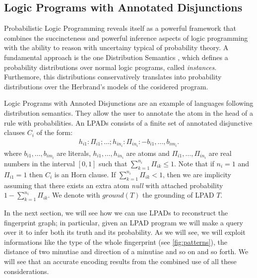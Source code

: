 \documentclass[8pt]{article}
\begin{document}
\subsection{Logic Programs with Annotated Disjunctions}
\label{sub:lpads}
Probabilistic Logic Programming reveals itself as a powerful framework that
combines the succincteness and powerful inference aspects of logic programming
with the ability to reason with uncertainy typical of probability theory.
A fundamental approach is the one Distribution Semantics
\cite{sato1995statistical}, which defines a probability distributions over
normal logic programs, called \emph{instances}. Furthemore, this distributions
conservatively translates into probability distributions over the Herbrand's
models of the cosidered program.

Logic Programs with Annoted Disjunctions \cite{vennekens2004logic} are an
example of languages following distribution semantics. They allow the user to
annotate the atom in the head of a rule with probabilities. An LPADs consists
of a finite set of annotated disjunctive clauses $C_i$ of the form:
  \begin{align*}
    h_{i1}:\Pi_{i1}; \dots ; h_{in_i}:\Pi_{in_i} \colon- b_{i1},\dots,b_{im_i}.
  \end{align*}
where $b_{i1},\dots,b_{im_i}$ are literals, $h_{i1},\dots,h_{in_i}$ are atoms
and $\Pi_{i1},\dots,\Pi_{in_i}$ are real numbers in the interval $[0,1]$ such
that $\sum_{k=1}^{n_i} \Pi_{ik} \le 1$. Note that if $n_i=1$ and $\Pi_{i1}=1$
then $C_i$ is an Horn clause.
If $\sum_{k=1}^{n_i} \Pi_{ik} < 1$, then we are implicity assuming that there
exists an extra atom \emph{null} with attached probability $1-\sum_{k=1}^{n_i}
\Pi_{ik}$. We denote with $ground(T)$ the grounding of LPAD $T$.

In the next section, we will see how we can use LPADs to reconstruct the
fingerprint graph; in particular, given an LPAD program we will make a query
over it to infer both its truth and its probability.  As we will see, we will
exploit informations like the type of the whole fingerprint (see
\cref{fig:patterns}), the distance of two minutiae and direction of a minutiae
and so on and so forth. We will see that an accurate encoding results from the
combined use of all these considerations.







\end{document}
